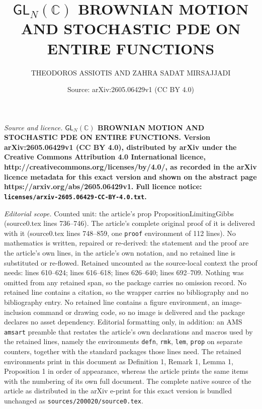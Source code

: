 \documentclass[10pt,a4paper]{amsart}
\title{\large \bf $\mathsf{GL}_N(\mathbb{C})$ BROWNIAN MOTION AND STOCHASTIC PDE ON ENTIRE FUNCTIONS}
\author{\small THEODOROS ASSIOTIS AND ZAHRA SADAT MIRSAJJADI}
\date{Source: arXiv:2605.06429v1 (CC BY 4.0)}
\begin{document}
\maketitle

\noindent\emph{Source and licence.} \large \bf $\mathsf{GL}_N(\mathbb{C})$ BROWNIAN MOTION AND STOCHASTIC PDE ON ENTIRE FUNCTIONS. Version arXiv:2605.06429v1 (CC BY 4.0), distributed by arXiv under the Creative Commons Attribution 4.0 International licence, http://creativecommons.org/licenses/by/4.0/, as recorded in the arXiv licence metadata for this exact version and shown on the abstract page https://arxiv.org/abs/2605.06429v1. Full licence notice: \texttt{licenses/arxiv-2605.06429-CC-BY-4.0.txt}.\par\smallskip

\noindent\textit{Editorial scope.} Counted unit: the article's prop PropositionLimitingGibbs (source0.tex lines 736--746). The article's complete original proof of it is delivered with it (source0.tex lines 748--859, one \texttt{proof} environment of 112 lines). No mathematics is written, repaired or re-derived: the statement and the proof are the article's own lines, in the article's own notation, and no retained line is substituted or re-flowed.  Retained uncounted as the source-local context the proof needs: lines 610--624; lines 616--618; lines 626--640; lines 692--709.  Nothing was omitted from any retained span, so the package carries no omission record.  No retained line contains a citation, so the wrapper carries no bibliography and no bibliography entry.  No retained line contains a figure environment, an image-inclusion command or drawing code, so no image is delivered and the package declares no asset dependency.  Editorial formatting only, in addition: an AMS \texttt{amsart} preamble that restates the article's own declarations and macros used by the retained lines, namely the environments \texttt{defn}, \texttt{rmk}, \texttt{lem}, \texttt{prop} on separate counters, together with the standard packages those lines need.  The retained environments print in this document as Definition 1, Remark 1, Lemma 1, Proposition 1 in order of appearance, whereas the article prints the same items with the numbering of its own full document.  The complete native source of the article as distributed in the arXiv e-print for this exact version is bundled unchanged as \texttt{sources/200020/source0.tex}.
\end{document}
